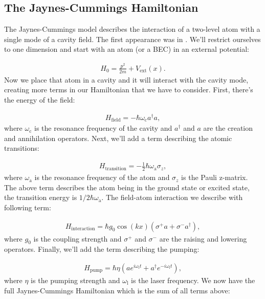 \subsection{The Jaynes-Cummings Hamiltonian}
The Jaynes-Cummings model describes the interaction of a two-level atom with a single mode of a cavity field. The first appearance was in \cite{jaynes}. We'll restrict ourselves to one dimension and start with an atom (or a BEC) in an external potential:

\begin{align}
H_0 = \frac{p^2}{2m} + V_\text{ext}(x).
\end{align}Now we place that atom in a cavity and it will interact with the cavity mode, creating more terms in our Hamiltonian that we have to consider. First, there's the energy of the field:

\begin{align}
H_\text{field} = -\hbar \omega_\text{c} a^\dagger a,
\end{align}where $\omega_\text{c}$ is the resonance frequency of the cavity and $a^\dagger$ and $a$ are the creation and annihilation operators. Next, we'll add a term describing the atomic transitions:

\begin{align}
H_\text{transition} = -\frac{1}{2}\hbar \omega_\text{a} \sigma_z,
\end{align}where $\omega_\text{a}$ is the resonance frequency of the atom and $\sigma_z$ is the Pauli z-matrix. The above term describes the atom being in the ground state or excited state, the transition energy is $1/2\hbar \omega_\text{a}$. The field-atom interaction we describe with following term:

\begin{align}
H_\text{interaction} = \hbar g_0 \cos(kx) (\sigma^+ a + \sigma^- a^\dagger),
\end{align}where $g_0$ is the coupling strength and $\sigma^+$ and $\sigma^-$ are the raising and lowering operators. Finally, we'll add the term describing the pumping:

\begin{align}
H_\text{pump} = \hbar \eta (a e^{i\omega_\text{l}t} + a^\dagger e^{-i\omega_\text{l}t}),
\end{align}where $\eta$ is the pumping strength and $\omega_\text{l}$ is the laser frequency. We now have the full Jaynes-Cummings Hamiltonian which is the sum of all terms above:

